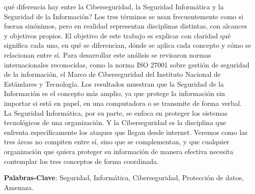 \documentclass[
	article,			%
	11pt,				%
	oneside,			%
	a4paper,			%
	english,			%
	brazil,				%
	sumario=tradicional
	]{abntex2}
\begin{document}
\frenchspacing 


%
%
\maketitle

\begin{columnaderesumen}
qué diferencia hay entre la
Ciberseguridad, la Seguridad Informática y la Seguridad de la Información? Los tres términos se usan frecuentemente como si fueran sinónimos, pero en realidad representan disciplinas distintas, con alcances y objetivos propios. El objetivo de este trabajo es explicar con claridad qué significa cada uno, en qué se diferencian, dónde se aplica cada concepto y cómo se relacionan entre sí. Para desarrollar este análisis se revisaron normas internacionales reconocidas, como la norma ISO 27001 sobre gestión de seguridad de la información, el Marco de Ciberseguridad del Instituto Nacional de Estándares y Tecnología.  Los resultados muestran que la Seguridad de la Información es el concepto más amplio, ya que protege la información sin importar si está en papel, en una computadora o se transmite de forma verbal.  La Seguridad Informática, por su parte, se enfoca en proteger los sistemas tecnológicos de una organización. Y la Ciberseguridad es la disciplina que enfrenta específicamente los ataques que llegan desde internet. Veremos como las tres áreas no compiten entre sí, sino que se complementan, y que cualquier organización que quiera proteger su información de manera efectiva necesita contemplar los tres conceptos de forma coordinada.

 
 \vspace{\onelineskip}
 
 \noindent
 \textbf{Palabras-Clave}: Seguridad, Informática, Ciberseguridad, Protección de datos, Amenaza.
\end{columnaderesumen}


\textual
\end{document}
